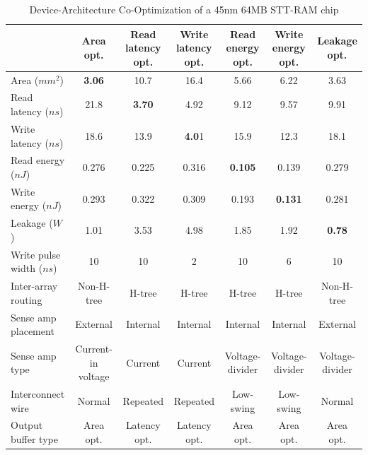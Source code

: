 \begin{table}[t]
\centering
\caption{Device-Architecture Co-Optimization of a 45nm 64MB STT-RAM chip}
\label{tb:bigtable}
\begin{tabular}{| l | c | c | c | c | c | c |}
\hline\hline
& Area opt. & Read latency opt. & Write latency opt. & Read energy opt. & Write energy opt. & Leakage opt. \\
\hline
Area ($mm^2$) & \textbf{3.06} & 10.7 & 16.4 & 5.66 & 6.22 & 3.63 \\
\hline
Read latency ($ns$) & 21.8 & \textbf{3.70} & 4.92 & 9.12 & 9.57 &	9.91 \\
\hline
Write latency ($ns$) & 18.6	& 13.9	& \textbf{4.0}1	& 15.9	& 12.3	& 18.1 \\
\hline
Read energy ($nJ$) & 0.276	& 0.225	& 0.316	& \textbf{0.105}	& 0.139	& 0.279 \\
\hline
Write energy ($nJ$) & 0.293	& 0.322	& 0.309	& 0.193	& \textbf{0.131}	& 0.281\\
\hline
Leakage ($W$) & 1.01	& 3.53	& 4.98	& 1.85	& 1.92	& \textbf{0.78}\\
\hline\hline
Write pulse width ($ns$) & 10 & 10 & 2 & 10 & 6 & 10 \\
\hline
Inter-array routing & Non-H-tree & H-tree & H-tree & H-tree & H-tree & Non-H-tree \\
\hline
Sense amp placement & External & Internal & Internal & Internal & Internal & External \\
\hline
Sense amp type & Current-in voltage & Current & Current & Voltage-divider & Voltage-divider & Voltage-divider \\
\hline
Interconnect wire & Normal & Repeated & Repeated & Low-swing & Low-swing & Normal \\
\hline
Output buffer type & Area opt. & Latency opt. & Latency opt. & Area opt. & Area opt. & Area opt. \\
\hline\hline
\end{tabular}
\end{table} 